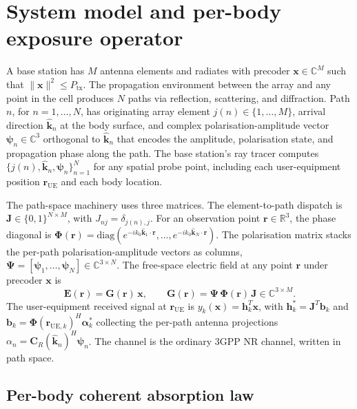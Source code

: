 \documentclass[journal,twocolumn,10pt]{IEEEtran}
\theoremstyle{plain}
\theoremstyle{remark}
\newcommand{\khat}{\hat{\bm{k}}}
\newcommand{\rr}{\mathbf{r}}
\newcommand{\xx}{\mathbf{x}}
\newcommand{\hh}{\mathbf{h}}
\newcommand{\bvec}{\mathbf{b}}
\newcommand{\GG}{\mathbf{G}}
\newcommand{\Jmat}{\mathbf{J}}
\newcommand{\Phimat}{\mathbf{\Phi}}
\newcommand{\Psimat}{\bm{\Psi}}
\newcommand{\psin}{\bm{\psi}_n}
\newcommand{\Complex}{\mathbb{C}}
\begin{document}
\section{System model and per-body exposure operator}\label{sec:setup}

A base station has $M$ antenna elements and radiates with precoder
$\xx \in \Complex^M$ such that $\|\xx\|^2 \leq P_{\mathrm{tx}}$. The
propagation environment between the array and any point in the cell
produces $N$ paths via reflection, scattering, and diffraction. Path
$n$, for $n = 1, \ldots, N$, has originating array element
$j(n) \in \{1, \ldots, M\}$, arrival direction $\khat_n$ at the
body surface, and complex polarisation-amplitude vector
$\psin \in \Complex^3$ orthogonal to $\khat_n$ that encodes the
amplitude, polarisation state, and propagation phase along the path.
The base station's ray tracer computes
$\{j(n), \khat_n, \psin\}_{n=1}^N$ for any spatial probe point,
including each user-equipment position $\rr_{\mathrm{UE}}$ and each
body location.

The path-space machinery uses three matrices. The element-to-path
dispatch is $\Jmat \in \{0, 1\}^{N \times M}$, with
$J_{nj} = \delta_{j(n), j}$. For an observation point
$\rr \in \mathbb{R}^3$, the phase diagonal is
$\Phimat(\rr) = \mathrm{diag}(e^{-i k_0 \khat_1 \cdot \rr}, \ldots,
e^{-i k_0 \khat_N \cdot \rr})$. The polarisation matrix stacks the
per-path polarisation-amplitude vectors as columns,
$\Psimat = [\bm\psi_1, \ldots, \bm\psi_N] \in \Complex^{3 \times N}$.
The free-space electric field at any point $\rr$ under precoder $\xx$
is
\begin{equation}\label{eq:E-decomp}
  \mathbf{E}(\rr) = \GG(\rr)\,\xx,
  \qquad
  \GG(\rr) = \Psimat\,\Phimat(\rr)\,\Jmat \in \Complex^{3 \times M}.
\end{equation}
The user-equipment received signal at $\rr_{\mathrm{UE}}$ is
$y_k(\xx) = \hh_k^T \xx$, with $\hh_k^* = \Jmat^T \bvec_k$ and
$\bvec_k = \Phimat(\rr_{\mathrm{UE},k})^H \bm\alpha_k^*$ collecting
the per-path antenna projections
$\alpha_n = \mathbf{C}_R(\khat_n)^H \psin$. The channel is the
ordinary 3GPP NR channel, written in path space.

\subsection{Per-body coherent absorption law}\label{sec:cohlaw}
\end{document}
